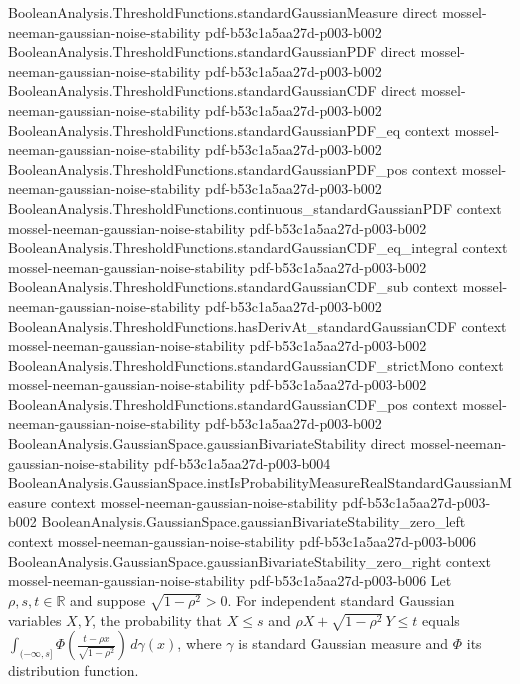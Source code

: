\begin{lemma}
\label{BooleanAnalysis.GaussianSpace.scalarGaussian_joint_threshold_integral}
\leanok
{}
\proofstep
  {BooleanAnalysis.ThresholdFunctions.standardGaussianMeasure}
  {direct}
  {mossel-neeman-gaussian-noise-stability}
  {pdf-b53c1a5aa27d-p003-b002}
\proofstep
  {BooleanAnalysis.ThresholdFunctions.standardGaussianPDF}
  {direct}
  {mossel-neeman-gaussian-noise-stability}
  {pdf-b53c1a5aa27d-p003-b002}
\proofstep
  {BooleanAnalysis.ThresholdFunctions.standardGaussianCDF}
  {direct}
  {mossel-neeman-gaussian-noise-stability}
  {pdf-b53c1a5aa27d-p003-b002}
\proofstep
  {BooleanAnalysis.ThresholdFunctions.standardGaussianPDF_eq}
  {context}
  {mossel-neeman-gaussian-noise-stability}
  {pdf-b53c1a5aa27d-p003-b002}
\proofstep
  {BooleanAnalysis.ThresholdFunctions.standardGaussianPDF_pos}
  {context}
  {mossel-neeman-gaussian-noise-stability}
  {pdf-b53c1a5aa27d-p003-b002}
\proofstep
  {BooleanAnalysis.ThresholdFunctions.continuous_standardGaussianPDF}
  {context}
  {mossel-neeman-gaussian-noise-stability}
  {pdf-b53c1a5aa27d-p003-b002}
\proofstep
  {BooleanAnalysis.ThresholdFunctions.standardGaussianCDF_eq_integral}
  {context}
  {mossel-neeman-gaussian-noise-stability}
  {pdf-b53c1a5aa27d-p003-b002}
\proofstep
  {BooleanAnalysis.ThresholdFunctions.standardGaussianCDF_sub}
  {context}
  {mossel-neeman-gaussian-noise-stability}
  {pdf-b53c1a5aa27d-p003-b002}
\proofstep
  {BooleanAnalysis.ThresholdFunctions.hasDerivAt_standardGaussianCDF}
  {context}
  {mossel-neeman-gaussian-noise-stability}
  {pdf-b53c1a5aa27d-p003-b002}
\proofstep
  {BooleanAnalysis.ThresholdFunctions.standardGaussianCDF_strictMono}
  {context}
  {mossel-neeman-gaussian-noise-stability}
  {pdf-b53c1a5aa27d-p003-b002}
\proofstep
  {BooleanAnalysis.ThresholdFunctions.standardGaussianCDF_pos}
  {context}
  {mossel-neeman-gaussian-noise-stability}
  {pdf-b53c1a5aa27d-p003-b002}
\proofstep
  {BooleanAnalysis.GaussianSpace.gaussianBivariateStability}
  {direct}
  {mossel-neeman-gaussian-noise-stability}
  {pdf-b53c1a5aa27d-p003-b004}
\proofstep
  {BooleanAnalysis.GaussianSpace.instIsProbabilityMeasureRealStandardGaussianMeasure}
  {context}
  {mossel-neeman-gaussian-noise-stability}
  {pdf-b53c1a5aa27d-p003-b002}
\proofstep
  {BooleanAnalysis.GaussianSpace.gaussianBivariateStability_zero_left}
  {context}
  {mossel-neeman-gaussian-noise-stability}
  {pdf-b53c1a5aa27d-p003-b006}
\proofstep
  {BooleanAnalysis.GaussianSpace.gaussianBivariateStability_zero_right}
  {context}
  {mossel-neeman-gaussian-noise-stability}
  {pdf-b53c1a5aa27d-p003-b006}
Let $\rho,s,t\in\mathbb R$ and suppose $\sqrt{1-\rho^2}>0$. For independent standard
Gaussian variables $X,Y$, the probability that $X\le s$ and $\rho
X+\sqrt{1-\rho^2}\,Y\le t$ equals
$\displaystyle\int_{(-\infty,s]}\Phi\!\left(\frac{t-\rho
x}{\sqrt{1-\rho^2}}\right)\,d\gamma(x)$, where $\gamma$ is standard Gaussian measure and
$\Phi$ its distribution function.
\end{lemma}

